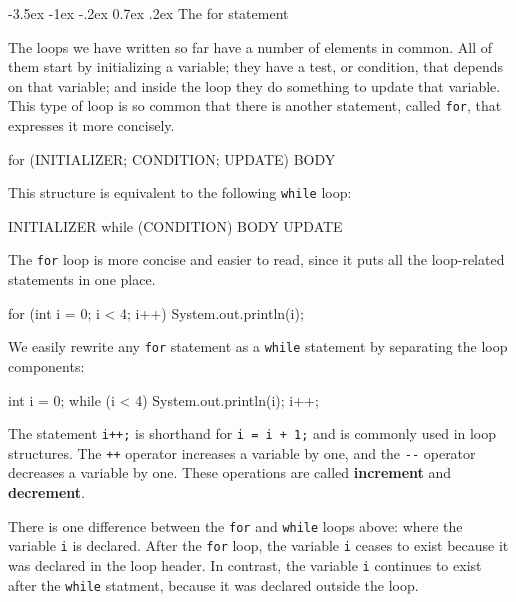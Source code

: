 \documentclass[12pt]{book}
\makeatletter
\theoremstyle{exercise}
\newcommand{\java}[1]{\verb"#1"}
\renewcommand{\section}{\@startsection{section}{1}{\z@}%
    {-3.5ex \@plus -1ex \@minus -.2ex}%
    {0.7ex \@plus.2ex}%
    {\normalfont\Large\bfseries}}
\newcommand{\java}[1]{\lstinline{#1}} %
\makeatother
\begin{document}
\section{The for statement}
\label{for}


The loops we have written so far have a number of elements in common.
All of them start by initializing a variable; they have a test, or condition, that depends on that variable; and inside the loop they do something to update that variable.
This type of loop is so common that there is another statement, called \java{for}, that expresses it more concisely.

\begin{code}
    for (INITIALIZER; CONDITION; UPDATE) {
        BODY
    }
\end{code}

This structure is equivalent to the following \java{while} loop:

\begin{code}
    INITIALIZER
    while (CONDITION) {
        BODY
        UPDATE
    }
\end{code}

The \java{for} loop is more concise and easier to read, since it puts all the loop-related statements in one place.

\begin{code}
    for (int i = 0; i < 4; i++) {
        System.out.println(i);
    }
\end{code}

We easily rewrite any \java{for} statement as a \java{while} statement by separating the loop components:

\begin{code}
    int i = 0;
    while (i < 4) {
        System.out.println(i);
        i++;
    }
\end{code}

The statement \java{i++;} is shorthand for \java{i = i + 1;} and is commonly used in loop structures.
The \java{++} operator increases a variable by one, and the \java{--} operator decreases a variable by one.
These operations are called {\bf increment} and {\bf decrement}.

There is one difference between the \java{for} and \java{while} loops above: where the variable \java{i} is declared.
After the \java{for} loop, the variable \java{i} ceases to exist because it was declared in the loop header.
In contrast, the variable \java{i} continues to exist after the \java{while} statment, because it was declared outside the loop.
\end{document}
